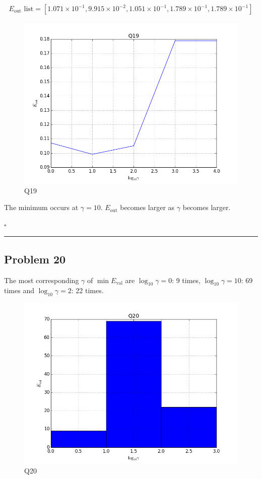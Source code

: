\documentclass[12pt]{article}
\newcommand*{\QEDB}{\hfill\ensuremath{\square}}
\newcommand{\SBrackets}[1]{\left[#1\right]}
\newcommand{\SciNum}[2]{#1\times{10}^{#2}}
\newcommand{\horrule}[1]{\rule{\linewidth}{#1}}
\begin{document}
\begin{align}
E_{\text{out}}\text{ list}=\SBrackets{\SciNum{1.071}{-1}, \SciNum{9.915}{-2}, \SciNum{1.051}{-1}, \SciNum{1.789}{-1}, \SciNum{1.789}{-1}}
\end{align}
\begin{figure}[H]
	\centering
	\includegraphics[scale=0.5]{Q19.png}
	\caption{Q19}
	\label{Q19}
\end{figure}
The minimum occurs at $\gamma=10$. $E_{\text{out}}$ becomes larger as $\gamma$ becomes larger.

\QEDB

\horrule{0.5pt}

\subsection*{Problem 20}

The most corresponding $\gamma$ of $\min E_{\text{val}}$ are $\log_{10}\gamma=0$: 9 times, $\log_{10}\gamma=10$: 69 times and $\log_{10}\gamma=2$: 22 times.
\begin{figure}[H]
	\centering
	\includegraphics[scale=0.5]{Q20.png}
	\caption{Q20}
	\label{Q20}
\end{figure}
\end{document}
